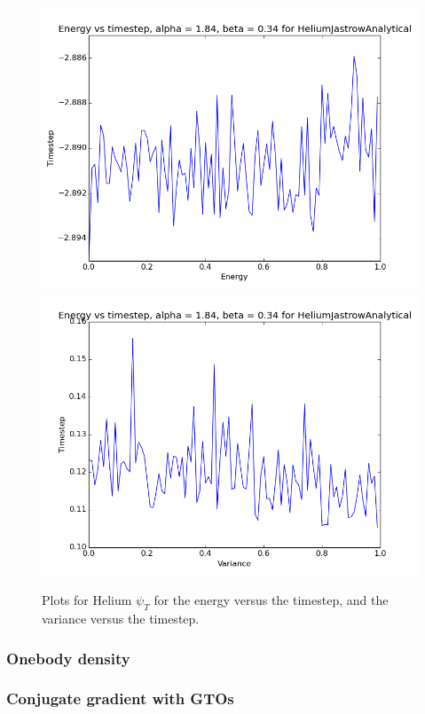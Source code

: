 			\begin{figure}
				\centering \includegraphics[width=0.45\linewidth]{../figures/HeliumJastrowAnalyticalTimeEnergy}
				\includegraphics[width=0.45\linewidth]{../figures/HeliumJastrowAnalyticalTimeVariance}
				\protect\caption{Plots for Helium $\psi_{T}$ for the energy versus the timestep, and the variance versus the timestep.}
				\label{fig:HeliumTimestep}
			\end{figure}

		\subsubsection{Onebody density}

		\subsubsection{Conjugate gradient with GTOs}
